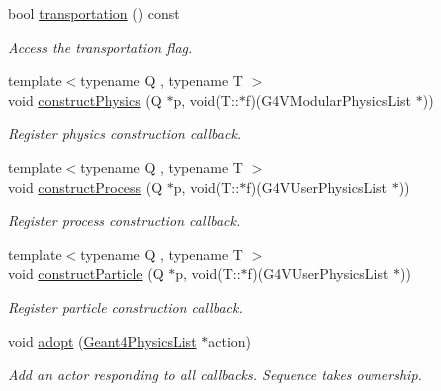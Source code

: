 \begin{DoxyCompactItemize}
bool \hyperlink{class_d_d4hep_1_1_simulation_1_1_geant4_physics_list_action_sequence_a5ca7f8265fef770ee4e7a1b9bcadf545}{transportation} () const 
\begin{DoxyCompactList}\small\item\em Access the transportation flag. \item\end{DoxyCompactList}\item 
{\footnotesize template$<$typename Q , typename T $>$ }\\void \hyperlink{class_d_d4hep_1_1_simulation_1_1_geant4_physics_list_action_sequence_a1ff8b7577fa7eb3acb26393328d8dad4}{constructPhysics} (Q $\ast$p, void(T::$\ast$f)(G4VModularPhysicsList $\ast$))
\begin{DoxyCompactList}\small\item\em Register physics construction callback. \item\end{DoxyCompactList}\item 
{\footnotesize template$<$typename Q , typename T $>$ }\\void \hyperlink{class_d_d4hep_1_1_simulation_1_1_geant4_physics_list_action_sequence_a415ec49dc9c79e44e52c3c99901e7e32}{constructProcess} (Q $\ast$p, void(T::$\ast$f)(G4VUserPhysicsList $\ast$))
\begin{DoxyCompactList}\small\item\em Register process construction callback. \item\end{DoxyCompactList}\item 
{\footnotesize template$<$typename Q , typename T $>$ }\\void \hyperlink{class_d_d4hep_1_1_simulation_1_1_geant4_physics_list_action_sequence_a31c1318893387db2f3441afbb7d6dd29}{constructParticle} (Q $\ast$p, void(T::$\ast$f)(G4VUserPhysicsList $\ast$))
\begin{DoxyCompactList}\small\item\em Register particle construction callback. \item\end{DoxyCompactList}\item 
void \hyperlink{class_d_d4hep_1_1_simulation_1_1_geant4_physics_list_action_sequence_a142dc8e16755a619d103c295b7e6445b}{adopt} (\hyperlink{class_d_d4hep_1_1_simulation_1_1_geant4_physics_list}{Geant4PhysicsList} $\ast$action)
\begin{DoxyCompactList}\small\item\em Add an actor responding to all callbacks. Sequence takes ownership. \item\end{DoxyCompactList}\item 

\end{DoxyCompactItemize}
